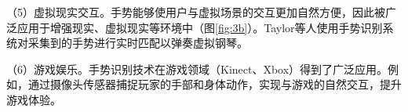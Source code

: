 
（5）虚拟现实交互。手势能够使用户与虚拟场景的交互更加自然方便，因此被广泛应用于增强现实、虚拟现实等环境中（图\ref{fig:3b}）。Taylor等人使用手势识别系统对采集到的手势进行实时匹配以弹奏虚拟钢琴\cite{taylor2016efficient}。

（6）游戏娱乐。手势识别技术在游戏领域（Kinect、Xbox）得到了广泛应用。例如，通过摄像头传感器捕捉玩家的手部和身体动作，实现与游戏的自然交互，提升游戏体验。

